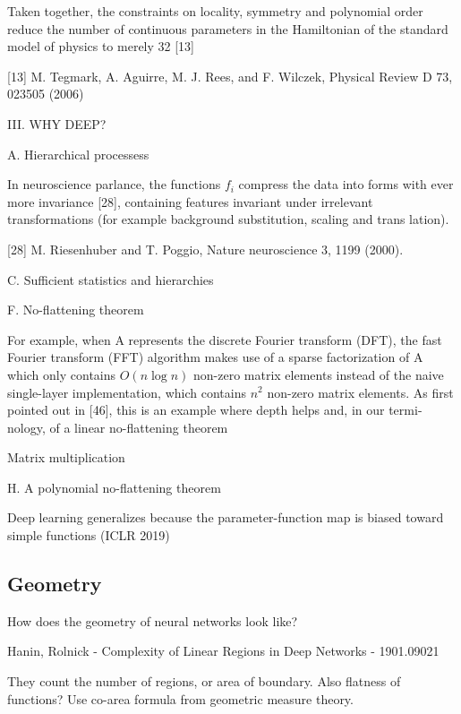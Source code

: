 \documentclass[english]{article}
\begin{document}
Taken together,
the constraints on locality, symmetry and polynomial order reduce the number of continuous parameters in the
Hamiltonian of the standard model of physics to merely
32 [13]


[13] M. Tegmark, A. Aguirre, M. J. Rees, and F. Wilczek,
Physical Review D 73, 023505 (2006)


\item III. WHY DEEP?

A. Hierarchical processess

In neuroscience parlance, the functions $f_i$ compress the
data into forms with ever more invariance [28], containing features invariant under irrelevant transformations
(for example background substitution, scaling and trans
lation).

[28] M. Riesenhuber and T. Poggio, Nature neuroscience 3, 1199 (2000).

C. Sufficient statistics and hierarchies

F. No-flattening theorem

For example, when A represents the discrete Fourier
transform (DFT), the fast Fourier transform (FFT) algorithm makes use of a sparse factorization of A which only
contains $O(n\log n)$ non-zero matrix elements instead of
the naive single-layer implementation, which contains $n^2$
non-zero matrix elements. As first pointed out in [46],
this is an example where depth helps and, in our termi-
nology, of a linear no-flattening theorem

Matrix multiplication

H. A polynomial no-flattening theorem

 
\eenum 

\item Deep learning generalizes because the parameter-function map is biased toward simple functions (ICLR 2019)


\eenum 

\subsection{Geometry}


\benum
\item How does the geometry of neural networks look like?


\item Hanin, Rolnick - Complexity of Linear Regions in Deep Networks - 1901.09021

They count the number of regions, or area of boundary. Also flatness of functions?
Use co-area formula from geometric measure theory.
\end{document}
